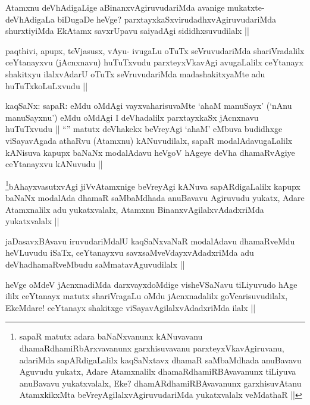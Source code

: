 \begin{artha}
Atamxnu deVhAdigaLige aBinanxvAgiruvudariMda avanige mukatxte- deVhAdigaLa biDugaDe heVge? parxtayxkaSxvirudadhxvAgiruvudariMda shurxtiyiMda EkAtamx savxrUpavu saiyadAgi sididhxsuvudilalx ||
\end{artha}

\begin{artha}
paqthivi, apupx, teVjasusx, vAyu- ivugaLu oTuTx seVruvudariMda shariVradalilx ceYtanayxvu (jAcnxnavu) huTuTxvudu parxteyxVkavAgi avugaLalilx ceYtanayx shakitxyu ilalxvAdarU oTuTx seVruvudariMda madashakitxyaMte adu huTuTxkoLuLxvudu ||
\end{artha}

\begin{artha}
kaqSaNx: sapaR: eMdu oMdAgi vayxvaharisuvaMte `ahaM manuSayx' (`nAnu manuSayxnu') eMdu oMdAgi I deVhadalilx parxtayxkaSx jAcnxnavu huTuTxvudu ||
``\stext'' matutx deVhakekx beVreyAgi `ahaM' eMbuva budidhxge viSayavAgada athaRvu (Atamxnu) kANuvudilalx, sapaR modalAdavugaLalilx kANisuva kapupx baNaNx modalAdavu heVgoV hAgeye deVha dhamaRvAgiye ceYtanayxvu kANuvudu ||
\end{artha}

\begin{artha}
\footnote[1]{sapaR matutx adara baNaNxvanunx kANuvavanu dhamaRdhamiRbArxvavanunx garxhisuvavanu parxteyxVkavAgiruvanu, adariMda sapARdigaLalilx kaqSaNxtavx dhamaR saMbaMdhada anuBavavu Aguvudu yukatx, Adare Atamxnalilx dhamaRdhamiRBAvavanunx tiLiyuva anuBavavu yukatxvalalx, Eke? dhamARdhamiRBAvavanunx garxhisuvAtanu AtamxkikxMta beVreyAgilalxvAgiruvudariMda yukatxvalalx veMdathaR ||}bAhayxvasutxvAgi jiVvAtamxnige beVreyAgi kANuva sapARdigaLalilx kapupx baNaNx modalAda dhamaR saMbaMdhada anuBavavu Agiruvudu yukatx, Adare Atamxnalilx adu yukatxvalalx, Atamxnu BinanxvAgilalxvAdadxriMda yukatxvalalx ||
\end{artha}

\begin{artha}
jaDasavxBAvavu iruvudariMdalU kaqSaNxvaNaR modalAdavu dhamaRveMdu heVLuvudu iSaTx, ceYtanayxvu savxsaMveVdayxvAdadxriMda adu deVhadhamaRveMbudu saMmatavAguvudilalx ||
\end{artha}

\begin{artha}
heVge oMdeV jAcnxnadiMda darxvayxdoMdige visheVSaNavu tiLiyuvudo hAge ililx ceYtanayx matutx shariVragaLu oMdu jAcnxnadalilx goVcarisuvudilalx, EkeMdare! ceYtanayx shakitxge viSayavAgilalxvAdadxriMda ilalx ||
\end{artha}

